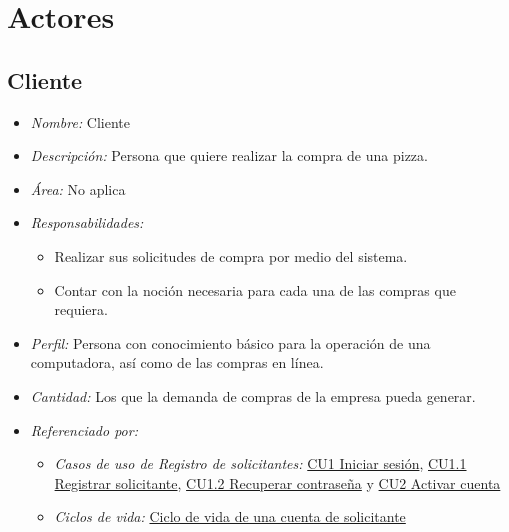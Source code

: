 
\pagebreak
\section{Actores}

	\hypertarget{A:Cliente}{}
	\subsection{Cliente}

		\begin{itemize}
			
			\item \textit{Nombre:} Cliente %
			
			\item \textit{Descripción:} Persona que quiere realizar la compra de una pizza.
			
			\item \textit{Área:} No aplica
			
			\item \textit{Responsabilidades:}

				\begin{itemize}
					\item Realizar sus solicitudes de compra por medio del sistema.
					\item Contar con la noción necesaria para cada una de las compras que requiera.
				\end{itemize}

			\item \textit{Perfil:} Persona con conocimiento básico para la operación de una computadora, así como de las compras en línea.
			
			\item \textit{Cantidad:} Los que la demanda de compras de la empresa pueda generar.

			\item \textit{Referenciado por:} 
		

				\begin{itemize}
					
					\item \textit{Casos de uso de Registro de solicitantes:} \hyperlink{CU1}{CU1 Iniciar sesión}, \hyperlink{CU1.1}{CU1.1 Registrar solicitante}, \hyperlink{CU1.2}{CU1.2 Recuperar contraseña} y \hyperlink{CU2}{CU2 Activar cuenta}

					\item \textit{Ciclos de vida:} \hyperlink{CV:CuentaSolicitante}{Ciclo de vida de una cuenta de solicitante}

				\end{itemize}

		\end{itemize}

